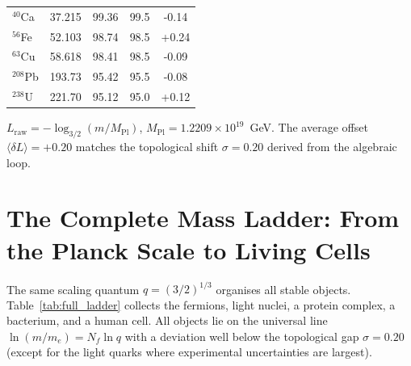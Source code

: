 \documentclass[12pt,a4paper]{article}
\begin{document}
\begin{table}[htbp]
\begin{tabular}{l c c c c}
			\(^{40}\)Ca & 37.215 & 99.36  & 99.5  & -0.14 \\
			\(^{56}\)Fe & 52.103 & 98.74  & 98.5  & +0.24 \\
			\(^{63}\)Cu & 58.618 & 98.41  & 98.5  & -0.09 \\
			\(^{208}\)Pb & 193.73 & 95.42  & 95.5  & -0.08 \\
			\(^{238}\)U & 221.70 & 95.12  & 95.0  & +0.12 \\
			\bottomrule
		\end{tabular}
		\par\smallskip
		\footnotesize
		\(L_{\mathrm{raw}} = -\log_{3/2}(m/M_{\mathrm{Pl}})\), \(M_{\mathrm{Pl}} = 1.2209\times10^{19}\)~GeV.  
		The average offset \(\langle\delta L\rangle = +0.20\) matches the topological shift \(\sigma = 0.20\) derived from the algebraic loop.
	\end{table}
	
	\section{The Complete Mass Ladder: From the Planck Scale to Living Cells}
	\label{sec:complete_ladder}
	
	The same scaling quantum \(q = (3/2)^{1/3}\) organises all stable objects.  
	Table~\ref{tab:full_ladder} collects the fermions, light nuclei, a protein complex, a bacterium, and a human cell.  
	All objects lie on the universal line \(\ln(m/m_e) = N_f \ln q\) with a deviation well below the topological gap \(\sigma=0.20\) (except for the light quarks where experimental uncertainties are largest).
	
\end{document}
